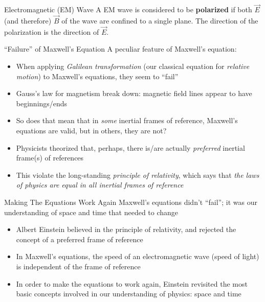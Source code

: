 \documentclass[12pt,aspectratio=169]{beamer}
\begin{document}
\begin{frame}{Electromagnetic (EM) Wave}
  A EM wave is considered to be \textbf{polarized} if both $\vec E$
  (and therefore) $\vec B$ of the wave are confined to a single plane. The
  direction of the polarization is the direction of $\vec E$.
  \begin{center}
  \end{center}
\end{frame}



\begin{frame}{``Failure'' of Maxwell's Equation}
  A peculiar feature of Maxwell's equation:
  \begin{itemize}
  \item When applying \emph{Galilean transformation} (our classical equation for
    \emph{relative motion}) to Maxwell's equations, they seem to ``fail''
  \item Gauss's law for magnetism break down: magnetic field lines appear to
    have beginnings/ends
  \item So does that mean that in \emph{some} inertial frames of reference,
    Maxwell's equations are valid, but in others, they are not?
  \item Physicists theorized that, perhaps, there is/are actually
    \emph{preferred} inertial frame(s) of references
  \item This violate the long-standing \emph{principle of relativity}, which
    says that \emph{the laws of physics are equal in all inertial frames of
    reference}
  \end{itemize}
\end{frame}



\begin{frame}{Making The Equations Work Again}
  Maxwell's equations didn't ``fail''; it was our understanding of space and
  time that needed to change
  \begin{itemize}
  \item Albert Einstein believed in the principle of relativity, and rejected
    the concept of a preferred frame of reference
  \item In Maxwell's equations, the speed of an electromagnetic wave (speed of
    light) is independent of the frame of reference
  \item In order to make the equations to work again, Einstein revisited the
    most basic concepts involved in our understanding of physics: space and
    time
  \end{itemize}
\end{frame}
\end{document}
